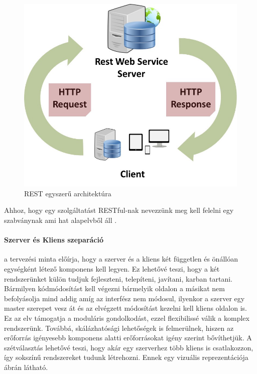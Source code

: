 \begin{figure}[t]
	\includegraphics[width=150mm, keepaspectratio]{figures/rest_structure.jpeg}
	\caption{REST egyszerű architektúra \cite{kep_rest}}
	\label{fig:rest_structure}
\end{figure}

Ahhoz, hogy egy szolgáltatást RESTful-nak nevezzünk meg kell felelni egy szabványnak ami hat alapelvből áll \cite{rest_1} \cite{rest_3}.


\paragraph{Szerver és Kliens szeparáció} a tervezési minta előírja, hogy a szerver és a kliens két független és önállóan egységként létező komponens kell legyen. Ez lehetővé teszi, hogy a két rendszerünket külön tudjuk fejleszteni, telepíteni, javítani, karban tartani. Bármilyen kódmódosítást kell végezni bármelyik oldalon a másikat nem befolyásolja mind addig amíg az interfész nem módosul, ilyenkor a szerver egy master szerepet vesz át és az elvégzett módosítást kezelni kell kliens oldalon is. Ez az elv támogatja a moduláris gondolkodást, ezzel flexibilissé válik a komplex rendszerünk. Továbbá, skálázhatósági lehetőségek is felmerülnek, hiszen az erőforrás igényesebb komponens alatti erőforrásokat igény szerint bővíthetjük. A szétválasztás lehetővé teszi, hogy akár egy szerverhez több kliens is csatlakozzon, így sokszínű rendszereket tudunk létrehozni. Ennek egy vizuális reprezentációja  ábrán látható.
